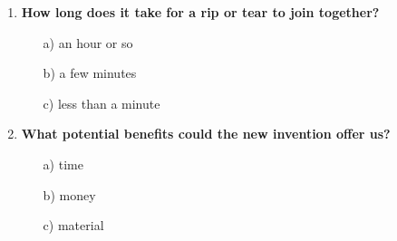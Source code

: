\begin{enumerate}
      \item \textbf{How long does it take for a rip or tear to join together?}
            \begin{enumerate}
                  \item[a)] an hour or so
                  \item[b)] a few minutes
                  \item[c)] less than a minute
            \end{enumerate}
      \item \textbf{What potential benefits could the new invention offer us?}
            \begin{enumerate}
                  \item[a)] time
                  \item[b)] money
                  \item[c)] material
            \end{enumerate}
\end{enumerate}

